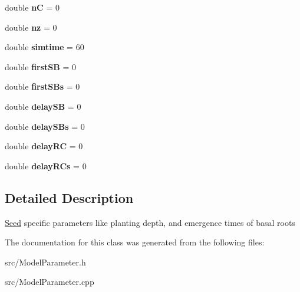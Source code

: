 \begin{DoxyCompactItemize}
double {\bfseries nC} = 0
\item 
\mbox{\label{classCPlantBox_1_1SeedRandomOrganParameter_a6838d0b1154a164693a0e6792110eb6d}} 
double {\bfseries nz} = 0
\item 
\mbox{\label{classCPlantBox_1_1SeedRandomOrganParameter_a5aa5855f388ca5275792dcddbf3082e9}} 
double {\bfseries simtime} = 60
\item 
\mbox{\label{classCPlantBox_1_1SeedRandomOrganParameter_a3556ac5740894ad1129647b8389dabaa}} 
double {\bfseries first\+SB} = 0
\item 
\mbox{\label{classCPlantBox_1_1SeedRandomOrganParameter_aa53cd184968b2accc4acd257a817a492}} 
double {\bfseries first\+S\+Bs} = 0
\item 
\mbox{\label{classCPlantBox_1_1SeedRandomOrganParameter_a122333268ab98b2bcae7a6112b8372b0}} 
double {\bfseries delay\+SB} = 0
\item 
\mbox{\label{classCPlantBox_1_1SeedRandomOrganParameter_ade0e515467b7975a67134727da587af5}} 
double {\bfseries delay\+S\+Bs} = 0
\item 
\mbox{\label{classCPlantBox_1_1SeedRandomOrganParameter_ac650ddc1fc2ddaa07d4dfab371792f8f}} 
double {\bfseries delay\+RC} = 0
\item 
\mbox{\label{classCPlantBox_1_1SeedRandomOrganParameter_a58c4224bcbd9ad477bb9cdadaf0a3599}} 
double {\bfseries delay\+R\+Cs} = 0
\end{DoxyCompactItemize}


\subsection{Detailed Description}
\hyperlink{classCPlantBox_1_1Seed}{Seed} specific parameters like planting depth, and emergence times of basal roots 

The documentation for this class was generated from the following files\+:\begin{DoxyCompactItemize}
\item 
src/Model\+Parameter.\+h\item 
src/Model\+Parameter.\+cpp\end{DoxyCompactItemize}
